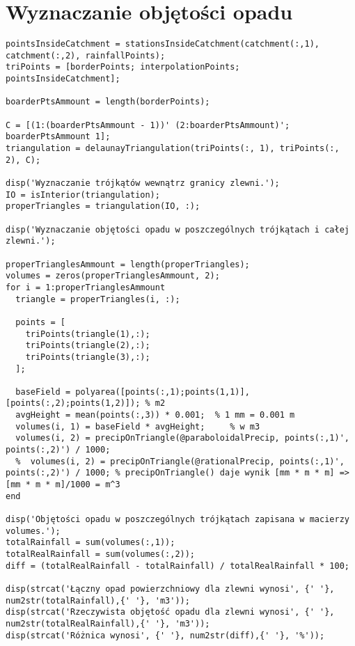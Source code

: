\section{Wyznaczanie objętości opadu}

\begin{lstlisting}
pointsInsideCatchment = stationsInsideCatchment(catchment(:,1), catchment(:,2), rainfallPoints);    
triPoints = [borderPoints; interpolationPoints; pointsInsideCatchment];

boarderPtsAmmount = length(borderPoints);
    
C = [(1:(boarderPtsAmmount - 1))' (2:boarderPtsAmmount)'; boarderPtsAmmount 1];
triangulation = delaunayTriangulation(triPoints(:, 1), triPoints(:, 2), C);

disp('Wyznaczanie trójkątów wewnątrz granicy zlewni.');
IO = isInterior(triangulation);
properTriangles = triangulation(IO, :);

disp('Wyznaczanie objętości opadu w poszczególnych trójkątach i całej zlewni.');

properTrianglesAmmount = length(properTriangles);
volumes = zeros(properTrianglesAmmount, 2);
for i = 1:properTrianglesAmmount
  triangle = properTriangles(i, :);
        
  points = [
    triPoints(triangle(1),:);
    triPoints(triangle(2),:);
    triPoints(triangle(3),:);
  ];

  baseField = polyarea([points(:,1);points(1,1)], [points(:,2);points(1,2)]); % m2
  avgHeight = mean(points(:,3)) * 0.001;  % 1 mm = 0.001 m
  volumes(i, 1) = baseField * avgHeight;     % w m3
  volumes(i, 2) = precipOnTriangle(@paraboloidalPrecip, points(:,1)', points(:,2)') / 1000;
  %  volumes(i, 2) = precipOnTriangle(@rationalPrecip, points(:,1)', points(:,2)') / 1000; % precipOnTriangle() daje wynik [mm * m * m] => [mm * m * m]/1000 = m^3
end

disp('Objętości opadu w poszczególnych trójkątach zapisana w macierzy volumes.');
totalRainfall = sum(volumes(:,1));
totalRealRainfall = sum(volumes(:,2));
diff = (totalRealRainfall - totalRainfall) / totalRealRainfall * 100;
    
disp(strcat('Łączny opad powierzchniowy dla zlewni wynosi', {' '}, num2str(totalRainfall),{' '}, 'm3'));
disp(strcat('Rzeczywista objętość opadu dla zlewni wynosi', {' '}, num2str(totalRealRainfall),{' '}, 'm3'));
disp(strcat('Różnica wynosi', {' '}, num2str(diff),{' '}, '%'));
\end{lstlisting}
